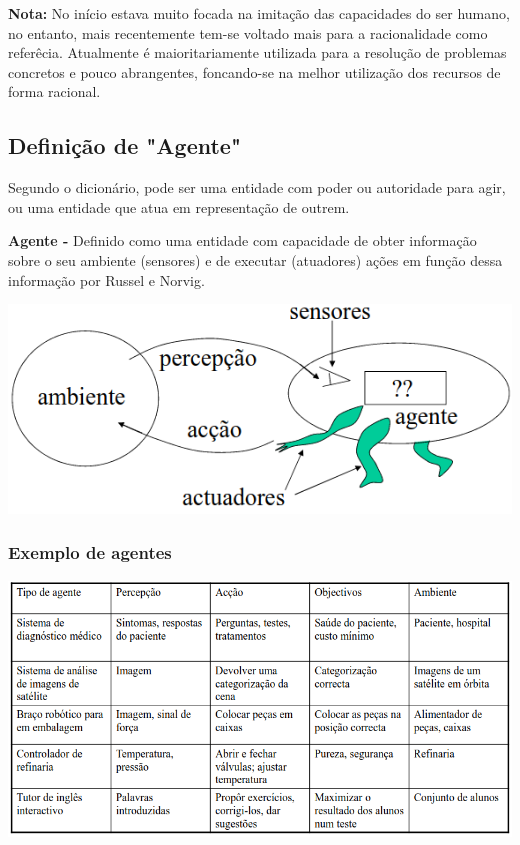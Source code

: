 \documentclass{article}
\begin{document}
\begin{flushleft}
  \textbf{Nota:} No início estava muito focada na imitação das capacidades do ser humano, no entanto, mais recentemente tem-se
  voltado mais para a racionalidade como referêcia. Atualmente é maioritariamente utilizada para a resolução de problemas concretos e pouco abrangentes, foncando-se
  na melhor utilização dos recursos de forma racional.
\end{flushleft}

\subsection{Definição de "Agente"}

Segundo o dicionário, pode ser uma entidade com poder ou autoridade para agir, ou
uma entidade que atua em representação de outrem.

\vspace{2mm}

\begin{flushleft}
  \textbf{Agente -} Definido como uma entidade com capacidade de obter informação sobre o seu ambiente
  (sensores) e de executar (atuadores) ações em função dessa informação por Russel e Norvig.
\end{flushleft}

\begin{center}
  \includegraphics[scale=0.3]{7}
\end{center}

\pagebreak

\subsubsection{Exemplo de agentes}

\begin{center}
  \includegraphics[scale=0.35]{8}
\end{center}
\end{document}
